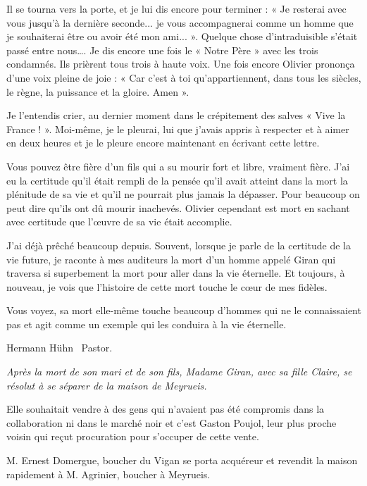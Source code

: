 
Il se tourna vers la porte, et je lui dis encore pour terminer : « Je resterai avec vous jusqu’à la
dernière seconde... je vous accompagnerai comme un homme que je souhaiterai être ou avoir été
mon ami... ». Quelque chose d’intraduisible s’était passé entre nous….
Je dis encore une fois le « Notre Père » avec les trois condamnés. Ils prièrent tous trois à haute
voix. Une fois encore Olivier prononça d’une voix pleine de joie : « Car c’est à toi
qu’appartiennent, dans tous les siècles, le règne, la puissance et la gloire. Amen ».

Je l’entendis crier, au dernier moment dans le crépitement des salves « Vive la France ! ».
Moi-même, je le pleurai, lui que j’avais appris à respecter et à aimer en deux heures et je le pleure
encore maintenant en écrivant cette lettre.

Vous pouvez être fière d’un fils qui a su mourir fort et libre, vraiment fière. J’ai eu la certitude
qu’il était rempli de la pensée qu’il avait atteint dans la mort la plénitude de sa vie et qu’il ne
pourrait plus jamais la dépasser. Pour beaucoup on peut dire qu’ils ont dû mourir inachevés.
Olivier cependant est mort en sachant avec certitude que l’œuvre de sa vie était accomplie.

J’ai déjà prêché beaucoup depuis. Souvent, lorsque je parle de la certitude de la vie future, je
raconte à mes auditeurs la mort d’un homme appelé Giran qui traversa si superbement la mort
pour aller dans la vie éternelle. Et toujours, à nouveau, je vois que l’histoire de cette mort touche
le cœur de mes fidèles.

Vous voyez, sa mort elle-même touche beaucoup d’hommes qui ne le connaissaient pas et agit
comme un exemple qui les conduira à la vie éternelle.

\begin{flushright}
Hermann Hühn \ Pastor.
\end{flushright}

\vspace{1.5em}

\begin{tcolorbox}[colback=white,colframe=black]
\itshape
Après la mort de son mari et de son fils, Madame Giran, avec sa fille Claire, se résolut à
se séparer de la maison de Meyrueis.

Elle souhaitait vendre à des gens qui n’avaient pas été compromis dans la collaboration
ni dans le marché noir et c’est Gaston Poujol, leur plus proche voisin qui
reçut procuration pour s’occuper de cette vente.

M. Ernest Domergue, boucher du Vigan se porta acquéreur et revendit la maison
rapidement à M. Agrinier, boucher à Meyrueis.
\end{tcolorbox}

